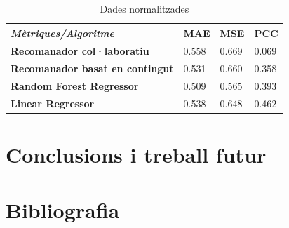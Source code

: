 \documentclass[11pt,a4paper,catalan]{article}
\begin{document}
\begin{table}[h]
\centering
\begin{tabular}{@{}llll@{}}
\toprule
\textit{\textbf{Mètriques/Algoritme}}   & \textbf{MAE} & \textbf{MSE} & \textbf{PCC} \\ \midrule
\textbf{Recomanador col·laboratiu}      & 0.558        & 0.669        & 0.069        \\
\textbf{Recomanador basat en contingut} & 0.531        & 0.660        & 0.358        \\
\textbf{Random Forest Regressor}        & 0.509        & 0.565        & 0.393        \\
\textbf{Linear Regressor}               & 0.538        & 0.648        & 0.462        \\ \bottomrule
\end{tabular}
\caption{Dades normalitzades}
\end{table}

\newpage
\section{Conclusions i treball futur}
\newpage
\section{Bibliografia}
\end{document}
